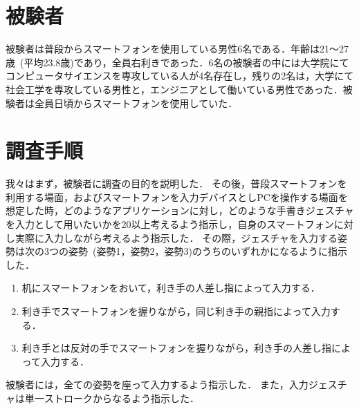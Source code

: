 \section{被験者}
被験者は普段からスマートフォンを使用している男性6名である．年齢は21〜27歳~(平均23.8歳)であり，全員右利きであった．6名の被験者の中には大学院にてコンピュータサイエンスを専攻している人が4名存在し，残りの2名は，大学にて社会工学を専攻している男性と，エンジニアとして働いている男性であった．被験者は全員日頃からスマートフォンを使用していた．



\section{調査手順}
我々はまず，被験者に調査の目的を説明した．
その後，普段スマートフォンを利用する場面，およびスマートフォンを入力デバイスとしPCを操作する場面を想定した時，どのようなアプリケーションに対し，どのような手書きジェスチャを入力として用いたいかを20以上考えるよう指示し，自身のスマートフォンに対し実際に入力しながら考えるよう指示した．
その際，ジェスチャを入力する姿勢は次の3つの姿勢~(姿勢1，姿勢2，姿勢3)のうちのいずれかになるように指示した．
\begin{enumerate}
\item 机にスマートフォンをおいて，利き手の人差し指によって入力する．
\item 利き手でスマートフォンを握りながら，同じ利き手の親指によって入力する．
\item 利き手とは反対の手でスマートフォンを握りながら，利き手の人差し指によって入力する．
\end{enumerate}
被験者には，全ての姿勢を座って入力するよう指示した．
また，入力ジェスチャは単一ストロークからなるよう指示した．

